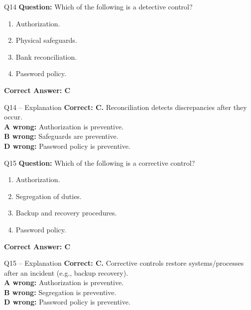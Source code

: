 \documentclass[aspectratio=169,10pt]{beamer}
\begin{document}
	\begin{frame}[t]{Q14}
		\small
		\textbf{Question:} Which of the following is a detective control?
		\begin{enumerate}[label=\Alph*.,itemsep=1pt,topsep=2pt]
			\item Authorization.
			\item Physical safeguards.
			\item Bank reconciliation.
			\item Password policy.
		\end{enumerate}
		\vspace{4pt}
		\textbf{Correct Answer: C}
	\end{frame}
	
	\begin{frame}[t]{Q14 -- Explanation}
		\small
		\textbf{Correct: C.} Reconciliation detects discrepancies after they occur. \\[4pt]
		\textbf{A wrong:} Authorization is preventive. \\[2pt]
		\textbf{B wrong:} Safeguards are preventive. \\[2pt]
		\textbf{D wrong:} Password policy is preventive.
	\end{frame}
	
	\begin{frame}[t]{Q15}
		\small
		\textbf{Question:} Which of the following is a corrective control?
		\begin{enumerate}[label=\Alph*.,itemsep=1pt,topsep=2pt]
			\item Authorization.
			\item Segregation of duties.
			\item Backup and recovery procedures.
			\item Password policy.
		\end{enumerate}
		\vspace{4pt}
		\textbf{Correct Answer: C}
	\end{frame}
	
	\begin{frame}[t]{Q15 -- Explanation}
		\small
		\textbf{Correct: C.} Corrective controls restore systems/processes after an incident (e.g., backup recovery). \\[4pt]
		\textbf{A wrong:} Authorization is preventive. \\[2pt]
		\textbf{B wrong:} Segregation is preventive. \\[2pt]
		\textbf{D wrong:} Password policy is preventive.
	\end{frame}
	
\end{document}
